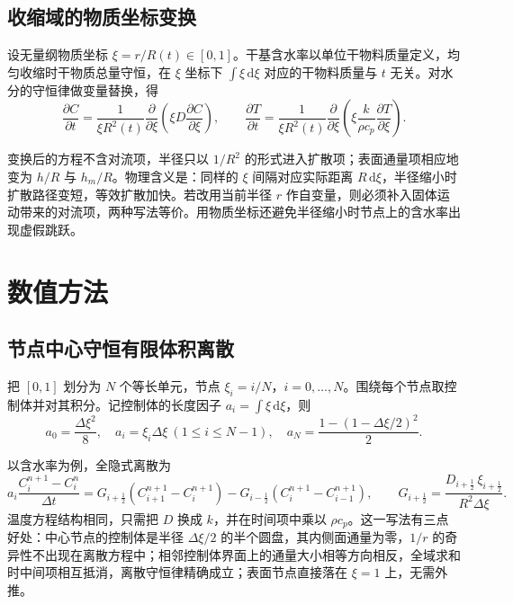 \documentclass[12pt,a4paper]{ctexart}
\begin{document}
\subsection{收缩域的物质坐标变换}

设无量纲物质坐标 $\xi=r/R(t)\in[0,1]$。干基含水率以单位干物料质量定义，均匀收缩时干物质总量守恒，在 $\xi$ 坐标下 $\int\xi\,\mathrm d\xi$ 对应的干物料质量与 $t$ 无关。对水分的守恒律做变量替换，得
\begin{equation}
\frac{\partial C}{\partial t}
=\frac{1}{\xi R^2(t)}\frac{\partial}{\partial \xi}\!\left(\xi D\frac{\partial C}{\partial \xi}\right),
\qquad
\frac{\partial T}{\partial t}
=\frac{1}{\xi R^2(t)}\frac{\partial}{\partial \xi}\!\left(\xi\frac{k}{\rho c_p}\frac{\partial T}{\partial \xi}\right).
\end{equation}

变换后的方程不含对流项，半径只以 $1/R^2$ 的形式进入扩散项；表面通量项相应地变为 $h/R$ 与 $h_m/R$。物理含义是：同样的 $\xi$ 间隔对应实际距离 $R\,\mathrm d\xi$，半径缩小时扩散路径变短，等效扩散加快。若改用当前半径 $r$ 作自变量，则必须补入固体运动带来的对流项，两种写法等价。用物质坐标还避免半径缩小时节点上的含水率出现虚假跳跃。

\section{数值方法}

\subsection{节点中心守恒有限体积离散}

把 $[0,1]$ 划分为 $N$ 个等长单元，节点 $\xi_i=i/N$，$i=0,\dots,N$。围绕每个节点取控制体并对其积分。记控制体的长度因子 $a_i=\int \xi\,\mathrm d\xi$，则
\begin{equation}
a_0=\frac{\Delta\xi^2}{8},\quad
a_i=\xi_i\Delta\xi\ (1\le i\le N-1),\quad
a_N=\frac{1-(1-\Delta\xi/2)^2}{2}.
\end{equation}

以含水率为例，全隐式离散为
\begin{equation}
a_i\frac{C_i^{n+1}-C_i^n}{\Delta t}
=G_{i+\frac12}\left(C_{i+1}^{n+1}-C_i^{n+1}\right)
-G_{i-\frac12}\left(C_i^{n+1}-C_{i-1}^{n+1}\right),
\qquad
G_{i+\frac12}=\frac{D_{i+\frac12}\,\xi_{i+\frac12}}{R^2\Delta\xi}.
\end{equation}
温度方程结构相同，只需把 $D$ 换成 $k$，并在时间项中乘以 $\rho c_p$。这一写法有三点好处：中心节点的控制体是半径 $\Delta\xi/2$ 的半个圆盘，其内侧面通量为零，$1/r$ 的奇异性不出现在离散方程中；相邻控制体界面上的通量大小相等方向相反，全域求和时中间项相互抵消，离散守恒律精确成立；表面节点直接落在 $\xi=1$ 上，无需外推。
\end{document}
